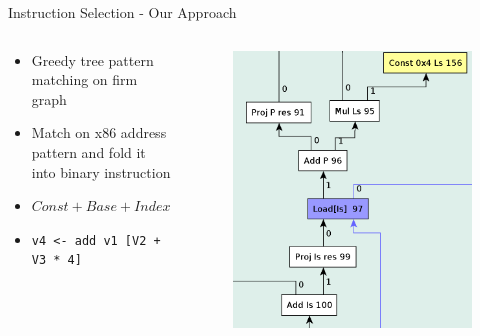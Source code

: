 \documentclass[en,16:9]{sdqbeamer}
\begin{document}
\begin{frame}{Instruction Selection - Our Approach}
	\begin{columns}
		\begin{column}{0.4\textwidth}
			\begin{itemize}
				\item Greedy tree pattern matching on firm graph
				\item Match on x86 address pattern and fold it into binary instruction
				\item $Const + Base + Index * Scale$
				\vspace{2em}
				\item \texttt{v4 <- add v1 [V2 + V3 * 4]}
			\end{itemize}
		\end{column}
		\begin{column}{0.6\textwidth}
			\vspace{-1em}
			\begin{figure}
				\centering
				\includegraphics[scale=0.27]{images/memory-match-firm-graph.png}
			\end{figure}
		\end{column}
	\end{columns}
\end{frame}
\end{document}
